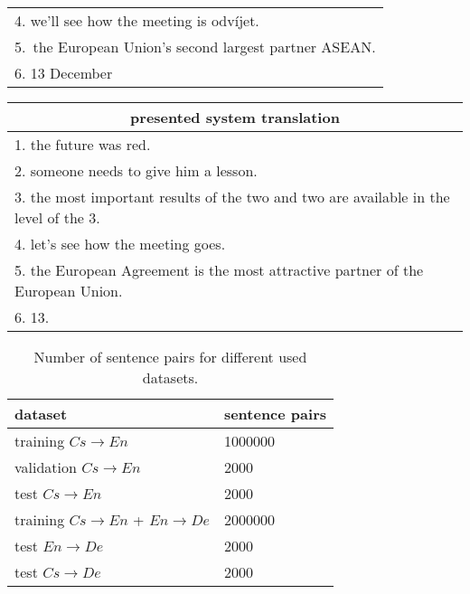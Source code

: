 \documentclass{ExcelAtFIT}
\begin{document}
\begin{table}[h!]
\begin{center}
\begin{tabular}{p{1\linewidth}}
          4. we'll see how the meeting is odvíjet. \\
          5.~the European Union's second largest partner ASEAN. \\
          6. 13 December \\
          \bottomrule
        \end{tabular}
    \end{center}
    \begin{center}
        \begin{tabular}{p{1\linewidth}}
          \toprule
          \multicolumn{1}{c}{presented system translation} \\
          \midrule
          1. the future was red. \\
          2. someone needs to give him a lesson. \\
          3. the most important results of the two and two are available in the level of the 3. \\
          4. let's see how the meeting goes. \\
          5. the European Agreement is the most attractive partner of the European Union. \\
          6. 13. \\
          \bottomrule
        \end{tabular}
    \end{center}
\end{table}

\begin{table}[h!]
    \caption{Number of sentence pairs for different used datasets.}
	\label{table:datasetsSize}
    \begin{center}    	
        \begin{tabular}{ll}
          \toprule
          dataset & sentence pairs \\
          \midrule
          training $Cs\rightarrow En$ & 1000000 \\
          validation $Cs\rightarrow En$ & 2000 \\
          test $Cs\rightarrow En$ & 2000 \\
          training $Cs\rightarrow En$ + $En\rightarrow De$ & 2000000 \\
          test $En\rightarrow De$ & 2000 \\
          test $Cs\rightarrow De$ & 2000 \\
          \bottomrule
        \end{tabular}
    \end{center}
\end{table}
\end{document}
